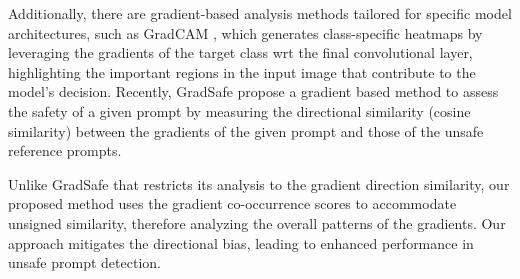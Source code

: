 Additionally, there are gradient-based analysis methods tailored for specific model architectures, such as GradCAM \citep{selvaraju2017grad}, which generates class-specific heatmaps by leveraging the gradients of the target class wrt the final convolutional layer, highlighting the important regions in the input image that contribute to the model's decision.  Recently, GradSafe \citep{xie2024gradsafe} propose a gradient based method to assess the safety of a given prompt by measuring the directional similarity (cosine similarity) between the gradients of the given prompt and those of the unsafe reference prompts.

Unlike GradSafe \citep{xie2024gradsafe} that restricts its analysis to the gradient direction similarity, our proposed method uses the gradient co-occurrence scores to accommodate unsigned similarity, therefore analyzing the overall patterns of the gradients. Our approach mitigates the directional bias, leading to enhanced performance in unsafe prompt detection.